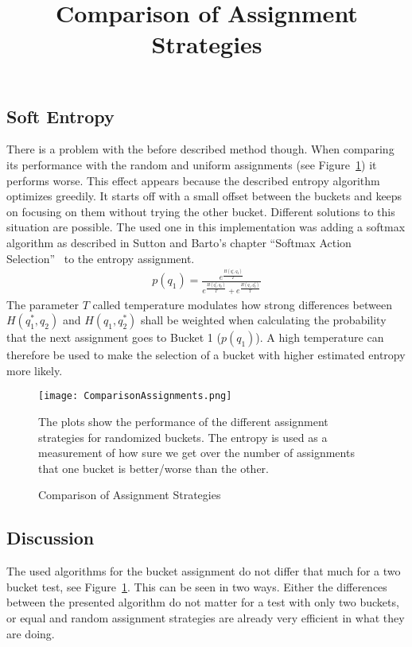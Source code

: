 \documentclass[../Thesis.tex]{subfiles}
\begin{document}
\subsection{Soft Entropy}
There is a problem with the before described method though. When comparing its performance with the random and uniform assignments (see Figure~\ref{fig:AssignmentComp}) it performs worse. This effect appears because the described entropy algorithm optimizes greedily. It starts off with a small offset between the buckets and keeps on focusing on them without trying the other bucket. Different solutions to this situation are possible. The used one in this implementation was adding a softmax algorithm as described in Sutton and Barto's chapter ``Softmax Action Selection''~\cite{sutton1998reinforcement} to the entropy assignment.
\begin{align*}
p(q_1) = \frac{e^{\frac{H(q_1^*,q_2)}{T}}}{e^{\frac{H(q_1^*,q_2)}{T}}+e^{\frac{H(q_1,q_2^*)}{T}}}
\end{align*}
The parameter $T$ called temperature modulates how strong differences between $H(q_1^*,q_2)$ and $H(q_1,q_2^*)$ shall be weighted when calculating the probability that the next assignment goes to Bucket 1 ($p(q_1)$). A high temperature can therefore be used to make the selection of a bucket with higher estimated entropy more likely.
\begin{figure}[ht]
\hfuzz=10cm
\texttt{[image: ComparisonAssignments.png]}
\centering
\title{Comparison of Assignment Strategies}
\caption{Comparison of Assignment Strategies}
The plots show the performance of the different assignment strategies for randomized buckets. The entropy is used as a measurement of how sure we get over the number of assignments that one bucket is better/worse than the other.
\label{fig:AssignmentComp}
\end{figure}
\subsection{Discussion}
The used algorithms for the bucket assignment do not differ that much for a two bucket test, see Figure~\ref{fig:AssignmentComp}. This can be seen in two ways. Either the differences between the presented algorithm do not matter for a test with only two buckets, or equal and random assignment strategies are already very efficient in what they are doing.
\end{document}
